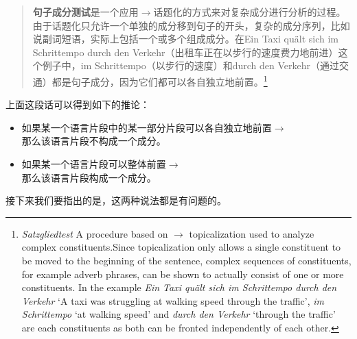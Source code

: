 \begin{quotation}
\textbf{句子成分测试}是一个应用$\to$话题化的方式来对复杂成分进行分析的过程。由于话题化只允许一个单独的成分移到句子的开头，复杂的成分序列，比如说副词短语，实际上包括一个或多个组成成分。在Ein Taxi quält sich im Schrittempo durch den Verkehr（出租车正在以步行的速度费力地前进）这个例子中，im Schrittempo（以步行的速度）和durch den Verkehr（通过交通）都是句子成分，因为它们都可以各自独立地前置。\citep[]{Bussmann83a}\footnote{%
\emph{Satzgliedtest} A procedure based on $\to$ topicalization used to analyze complex constituents.Since topicalization only allows a single constituent to be moved to the beginning of the sentence, complex sequences of constituents, for example adverb phrases, can be shown to actually consist of one or more constituents. In the example \textit{Ein Taxi quält sich im Schrittempo durch den Verkehr} `A taxi was struggling at walking speed through the traffic', \textit{im Schrittempo} `at walking speed' and \textit{durch den Verkehr} `through the traffic' are each constituents as both can be fronted independently of each other.}
\end{quotation}

\noindent
上面这段话可以得到如下的推论：
\begin{itemize}
\item 如果某一个语言片段中的某一部分片段可以各自独立地前置$\to$\\
	那么该语言片段不构成一个成分。
\item 如果某一个语言片段可以整体前置$\to$\\
	那么该语言片段构成一个成分。
\end{itemize}
接下来我们要指出的是，这两种说法都是有问题的。

